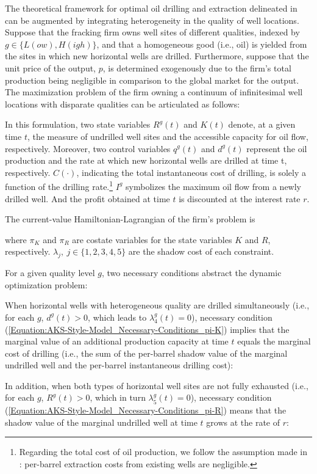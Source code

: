 The theoretical framework for optimal oil drilling and extraction delineated in \cite{Hotelling-under-Pressure_AKS_2018} can be augmented by integrating heterogeneity in the quality of well locations. Suppose that the fracking firm owns well sites of different qualities, indexed by $g \in \{L(ow), H(igh)\}$, and that a homogeneous good (i.e., oil) is yielded from the sites in which new horizontal wells are drilled. Furthermore, suppose that the unit price of the output, $p$, is determined exogenously due to the firm's total production being negligible in comparison to the global market for the output. The maximization problem of the firm owning a continuum of infinitesimal well locations with disparate qualities can be articulated as follows:

In this formulation, two state variables $R^{g}(t)$ and $K(t)$ denote, at a given time $t$, the measure of undrilled well sites and the accessible capacity for oil flow, respectively. Moreover, two control variables $q^{g}(t)$ and $d^{g}(t)$ represent the oil production and the rate at which new horizontal wells are drilled at time t, respectively. $C(\cdot)$, indicating the total instantaneous cost of drilling, is solely a function of the drilling rate.\footnote{Regarding the total cost of oil production, we follow the assumption made in \cite{Hotelling-under-Pressure_AKS_2018}: per-barrel extraction costs from existing wells are negligible.} $I^{g}$ symbolizes the maximum oil flow from a newly drilled well. And the profit obtained at time $t$ is discounted at the interest rate $r$. 

The current-value Hamiltonian-Lagrangian of the firm's problem is

where $\pi_{K}$ and $\pi_{R}$ are costate variables for the state variables $K$ and $R$, respectively. $\lambda_{j}, \ j \in \{1, 2, 3, 4, 5\}$ are the shadow cost of each constraint.

For a given quality level $g$, two necessary conditions abstract the dynamic optimization problem:

When horizontal wells with heterogeneous quality are drilled simultaneously (i.e., for each $g$, $d^{g}(t) >0$, which leads to $\lambda_{4}^{g}(t) = 0$), necessary condition (\ref{Equation:AKS-Style-Model_Necessary-Conditions_pi-K}) implies that the marginal value of an additional production capacity at time $t$ equals the marginal cost of drilling (i.e., the sum of the per-barrel shadow value of the marginal undrilled well and the per-barrel instantaneous drilling cost):

In addition, when both types of horizontal well sites are not fully exhausted (i.e., for each $g$, $R^{g}(t) > 0$, which in turn $\lambda_{5}^{g}(t) = 0$), necessary condition (\ref{Equation:AKS-Style-Model_Necessary-Conditions_pi-R}) means that the shadow value of the marginal undrilled well at time $t$ grows at the rate of $r$:


